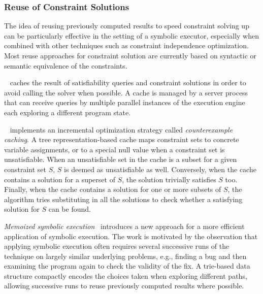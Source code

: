 
\subsubsection{Reuse of Constraint Solutions}
\label{ss:constraint-reuse}

The idea of reusing previously computed results to speed constraint solving up can be particularly effective in the setting of a symbolic executor, especially when combined with other techniques such as constraint independence optimization. Most reuse approaches for constraint solution are currently based on syntactic or semantic equivalence of the constraints.

~\cite{EXE-CCS06} caches the result of satisfiability queries and constraint solutions in order to avoid calling the solver when possible. A cache is managed by a server process that can receive queries by multiple parallel instances of the execution engine each exploring a different program state.

~\cite{KLEE-OSDI08} implements an incremental optimization strategy called {\em counterexample caching}. A tree representation-based cache maps constraint sets to concrete variable assignments, or to a special null value when a constraint set is unsatisfiable. When an unsatisfiable set in the cache is a subset for a given constraint set $S$, $S$ is deemed as unsatisfiable as well. Conversely, when the cache contains a solution for a superset of $S$, the solution trivially satisfies $S$ too. Finally, when the cache contains a solution for one or more subsets of $S$, the algorithm tries substituting in all the solutions to check whether a satisfying solution for $S$ can be found.

{\em Memoized symbolic execution}~\cite{MEMO-ISSTA12} introduces a new approach for a more efficient application of symbolic execution. The work is motivated by the observation that applying symbolic execution often requires several successive runs of the technique on largely similar underlying problems, e.g., finding a bug and then examining the program again to check the validity of the fix. A trie-based data structure compactly encodes the choices taken when exploring different paths, allowing successive runs to reuse previously computed results where possible.

